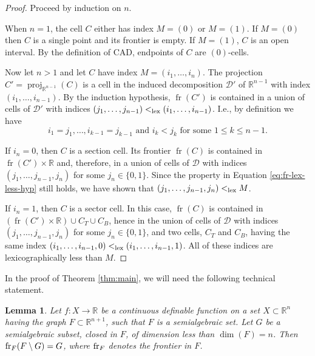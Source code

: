 \documentclass[
]{book}
\newtheorem{lemma}{Lemma}[chapter]
\theoremstyle{definition}
\theoremstyle{definition}
\theoremstyle{definition}
\theoremstyle{definition}
\theoremstyle{remark}
\begin{document}
\begin{proof}
Proceed by induction on \(n\).

When \(n=1\), the cell \(C\) either has index \(M=(0)\) or \(M=(1)\).
If \(M=(0)\) then \(C\) is a single point and its frontier is empty.
If \(M=(1)\), \(C\) is an open interval. By the definition of CAD, endpoints of \(C\) are \((0)\)-cells.

Now let \(n>1\) and let \(C\) have index \(M=(i_1,\ldots,i_n)\).
The projection \(C'=\operatorname{proj}_{\mathbb{R}^{n-1}}(C)\) is a cell in the induced decomposition \(\mathcal{D'}\) of \(\mathbb{R}^{n-1}\)
with index \((i_1,\ldots,i_{n-1})\).
By the induction hypothesis, \({\operatorname{fr} \left( C' \right)}\) is contained in a union of cells of \(\mathcal{D'}\) with indices
\((j_1,\ldots,j_{n-1}) <_{\rm{lex}}(i_1,\ldots,i_{n-1})\). I.e., by definition we have
\begin{equation}
i_1=j_1,\ldots,i_{k-1} = j_{k-1} \text{ and } i_k < j_k \text{ for some } 1 \le k \le n - 1.
\label{eq:fr-lex-less-hyp}
\end{equation}

If \(i_n=0\), then \(C\) is a section cell.
Its frontier \({\operatorname{fr} \left( C \right)}\) is contained in \({\operatorname{fr} \left( C' \right)} \times \mathbb{R}\) and, therefore, in a union of
cells of \(\mathcal D\) with indices \((j_1,\ldots,j_{n-1}, j_n)\) for some \(j_n \in \{ 0,1 \}\).
Since the property in Equation \eqref{eq:fr-lex-less-hyp} still holds, we have shown that \((j_1,\ldots,j_{n-1}, j_n) <_{\rm{lex}}M\).

If \(i_n=1\), then \(C\) is a sector cell.
In this case, \({\operatorname{fr} \left( C \right)}\) is contained in \(({\operatorname{fr} \left( C' \right)} \times \mathbb{R}) \cup C_T \cup C_B\), hence in the
union of cells of \(\mathcal D\) with indices \((j_1,\ldots,j_{n-1}, j_n)\) for some \(j_n \in \{0,1\}\),
and two cells, \(C_T\) and \(C_B\), having the same index \((i_1,\ldots,i_{n-1},0) <_{\rm{lex}}(i_1,\ldots,i_{n-1},1)\).
All of these indices are lexicographically less than \(M\).
\end{proof}

In the proof of Theorem \ref{thm:main}, we will need the following technical statement.

\begin{lemma}
\protect\hypertarget{lem:section-split}{}\label{lem:section-split}Let \(f: X \to \mathbb{R}\) be a continuous definable function on a set
\(X \subset \mathbb{R}^n\) having the graph \(F \subset \mathbb{R}^{n+1}\), such that \(F\) is a semialgebraic set.
Let \(G\) be a semialgebraic subset, closed in \(F\), of dimension less than \(\dim (F)=n\).
Then \({\rm{fr}}_{F}(F \setminus G) = G\), where \({\rm{fr}}_F\) denotes the frontier in \(F\).
\end{lemma}
\end{document}
